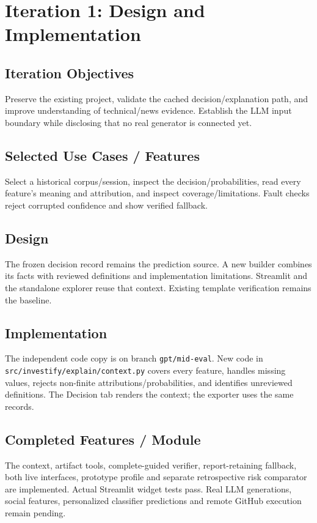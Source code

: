 \chapter{Iteration 1: Design and Implementation}
\section{Iteration Objectives}
Preserve the existing project, validate the cached decision/explanation path, and improve understanding of technical/news evidence. Establish the LLM input boundary while disclosing that no real generator is connected yet.

\section{Selected Use Cases / Features}
Select a historical corpus/session, inspect the decision/probabilities, read every feature's meaning and attribution, and inspect coverage/limitations. Fault checks reject corrupted confidence and show verified fallback.

\section{Design}
The frozen decision record remains the prediction source. A new builder combines its facts with reviewed definitions and implementation limitations. Streamlit and the standalone explorer reuse that context. Existing template verification remains the baseline.

\section{Implementation}
The independent code copy is on branch \texttt{gpt/mid-eval}. New code in \texttt{src/investify/explain/context.py} covers every feature, handles missing values, rejects non-finite attributions/probabilities, and identifies unreviewed definitions. The Decision tab renders the context; the exporter uses the same records.

\section{Completed Features / Module}
The context, artifact tools, complete-guided verifier, report-retaining fallback, both live interfaces, prototype profile and separate retrospective risk comparator are implemented. Actual Streamlit widget tests pass. Real LLM generations, social features, personalized classifier predictions and remote GitHub execution remain pending.

